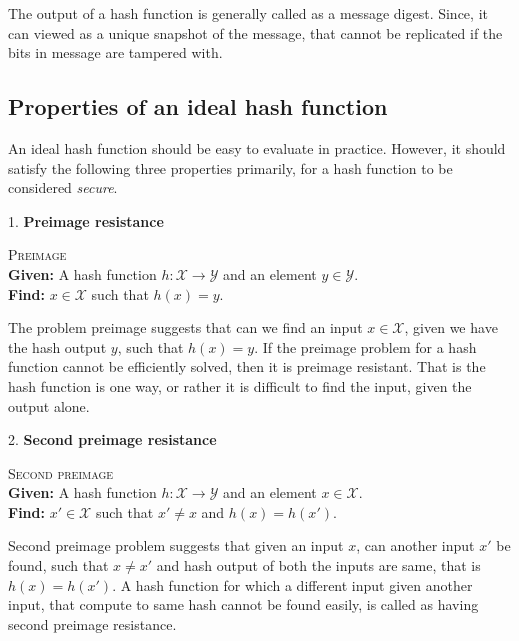 \documentclass[12pt]{artikel3}                  %
\begin{document}
  The output of a hash function is generally called as a message digest. Since, it can viewed as a unique
  snapshot of the message, that cannot be replicated if the bits in message are tampered with.
    
  \subsection{Properties of an ideal hash function}
  An ideal hash function should be easy to evaluate in practice. However, it should satisfy the following
  three properties primarily, for a hash function to be considered \emph{secure}.

  1. {\bf Preimage resistance}
  \begin{center}
    \framebox
    {
      \parbox{350pt}
      {
        \centering \textsc{Preimage} \\
        {\bf Given:} A hash function $h : \mathcal{X} \to \mathcal{Y}$ and an element $y \in \mathcal{Y}$. \\
        {\bf Find:} $x \in \mathcal{X}$ such that $h(x) = y$. 
      }
    }
  \end{center}
  \vspace{4mm}

  The problem preimage suggests that can we find an input $x \in \mathcal{X}$, given we have the hash 
  output $y$, such that $h(x) = y$. If the preimage problem for a hash function cannot be efficiently
  solved, then it is preimage resistant. That is the hash function is one way, or rather it is difficult
  to find the input, given the output alone.

  2. {\bf Second preimage resistance}
  \begin{center}
    \framebox
    {
      \parbox{350pt}
      {
        \centering \textsc{Second preimage} \\
        {\bf Given:} A hash function $h : \mathcal{X} \to \mathcal{Y}$ and an element $x \in \mathcal{X}$. \\
        {\bf Find:} $x' \in \mathcal{X}$ such that $x' \neq x$ and $h(x) = h(x')$. 
      }
    }
  \end{center}
  \vspace{4mm}

  Second preimage problem suggests that given an input $x$, can another input $x'$ be found, such that
  $ x \neq x'$ and hash output of both the inputs are same, that is $h(x) = h(x')$. A hash function for
  which a different input given another input, that compute to same hash cannot be found easily, is 
  called as having second preimage resistance.
\end{document}

